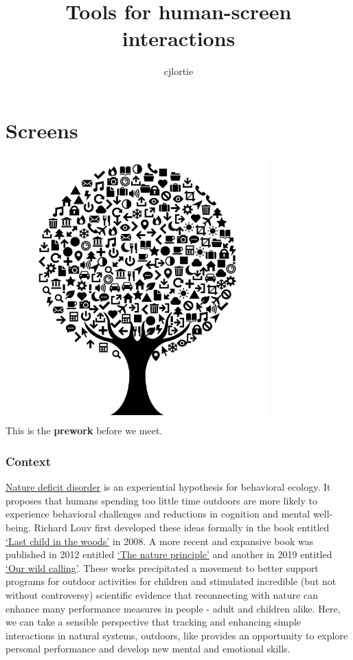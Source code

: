 \documentclass[
]{book}
\title{Tools for human-screen interactions}
\author{cjlortie}
\date{}
\begin{document}
\maketitle

{
\setcounter{tocdepth}{1}
\tableofcontents
}
\hypertarget{screens}{%
\chapter{Screens}\label{screens}}

\includegraphics[width=4in,height=\textheight]{./tree.png}\\
This is the \textbf{prework} before we meet.

\hypertarget{context}{%
\subsection*{Context}\label{context}}

\href{https://en.wikipedia.org/wiki/Nature_deficit_disorder}{Nature deficit disorder} is an experiential hypothesis for behavioral ecology. It proposes that humans spending too little time outdoors are more likely to experience behavioral challenges and reductions in cognition and mental well-being. Richard Louv first developed these ideas formally in the book entitled \href{http://richardlouv.com/books/last-child}{`Last child in the woods'} in 2008. A more recent and expansive book was published in 2012 entitled \href{http://richardlouv.com/books/nature-principle}{`The nature principle'} and another in 2019 entitled \href{http://richardlouv.com/books/}{`Our wild calling'}. These works precipitated a movement to better support programs for outdoor activities for children and stimulated incredible (but not without controversy) scientific evidence that reconnecting with nature can enhance many performance measures in people - adult and children alike. Here, we can take a sensible perspective that tracking and enhancing simple interactions in natural systems, outdoors, like provides an opportunity to explore personal performance and develop new mental and emotional skills.
\end{document}
